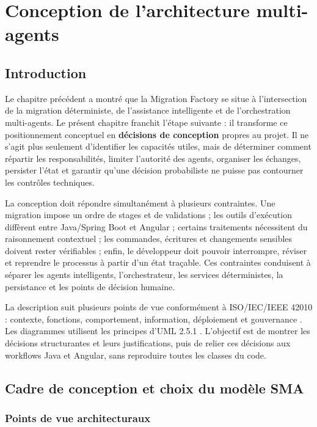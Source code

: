 \chapter{Conception de l'architecture multi-agents}

\section*{Introduction}

Le chapitre précédent a montré que la Migration Factory se situe à l'intersection de la migration déterministe, de l'assistance intelligente et de l'orchestration multi-agents. Le présent chapitre franchit l'étape suivante : il transforme ce positionnement conceptuel en \textbf{décisions de conception} propres au projet. Il ne s'agit plus seulement d'identifier les capacités utiles, mais de déterminer comment répartir les responsabilités, limiter l'autorité des agents, organiser les échanges, persister l'état et garantir qu'une décision probabiliste ne puisse pas contourner les contrôles techniques.

La conception doit répondre simultanément à plusieurs contraintes. Une migration impose un ordre de stages et de validations ; les outils d'exécution diffèrent entre Java/Spring Boot et Angular ; certains traitements nécessitent du raisonnement contextuel ; les commandes, écritures et changements sensibles doivent rester vérifiables ; enfin, le développeur doit pouvoir interrompre, réviser et reprendre le processus à partir d'un état traçable. Ces contraintes conduisent à séparer les agents intelligents, l'orchestrateur, les services déterministes, la persistance et les points de décision humaine.

La description suit plusieurs points de vue conformément à ISO/IEC/IEEE 42010 : contexte, fonctions, comportement, information, déploiement et gouvernance \cite{iso42010}. Les diagrammes utilisent les principes d'UML 2.5.1 \cite{omguml}. L'objectif est de montrer les décisions structurantes et leurs justifications, puis de relier ces décisions aux workflows Java et Angular, sans reproduire toutes les classes du code.

\section{Cadre de conception et choix du modèle SMA}

\subsection{Points de vue architecturaux}

